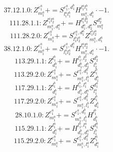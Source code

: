 \documentclass[letterpaper,10pt,fleqn,leqno,onecolumn]{article}
\begin{document}
\begin{equation} \;\;\;\;\;\;  37.12.1.0: Z^{e_{1}^{a}}_{m_{1}^{a}}+=S^{e_{1}^{a},d_{1}^{b}}_{l_{1}^{a}l_{1}^{b}}H^{l_{1}^{a}l_{1}^{b}}_{m_{1}^{a},d_{1}^{b}}\cdot -1. \end{equation}
\begin{equation} \;\;\;\;\;\;  111.28.1.1: Z^{l_{1}^{a}l_{2}^{a}}_{m_{1}^{a},d_{1}^{a}}+=H^{l_{1}^{a}l_{2}^{a}}_{d_{1}^{a},d_{2}^{a}}S^{d_{2}^{a}}_{m_{1}^{a}} \end{equation}
\begin{equation} \;\;\;\;\;\;  111.28.2.0: Z^{e_{1}^{a}}_{m_{1}^{a}}+=S^{e_{1}^{a},d_{1}^{a}}_{l_{1}^{a}l_{2}^{a}}Z^{l_{1}^{a}l_{2}^{a}}_{m_{1}^{a},d_{1}^{a}} \end{equation}
\begin{equation} \;\;\;\;\;\;  38.12.1.0: Z^{e_{1}^{a}}_{m_{1}^{a}}+=S^{e_{1}^{a},d_{1}^{a}}_{l_{1}^{a}l_{2}^{a}}H^{l_{1}^{a}l_{2}^{a}}_{m_{1}^{a},d_{1}^{a}}\cdot -1. \end{equation}
\begin{equation} \;\;\;\;\;\;  113.29.1.1: Z^{l_{1}^{b}}_{d_{1}^{b}}+=H^{l_{1}^{b},l_{2}^{b}}_{d_{1}^{b},d_{2}^{b}}S^{d_{2}^{b}}_{l_{2}^{b}} \end{equation}
\begin{equation} \;\;\;\;\;\;  113.29.2.0: Z^{e_{1}^{a}}_{m_{1}^{a}}+=S^{e_{1}^{a},d_{1}^{b}}_{m_{1}^{a},l_{1}^{b}}Z^{l_{1}^{b}}_{d_{1}^{b}} \end{equation}
\begin{equation} \;\;\;\;\;\;  117.29.1.1: Z^{l_{1}^{b}}_{d_{1}^{b}}+=H^{l_{1}^{b},l_{1}^{a}}_{d_{1}^{b},d_{1}^{a}}S^{d_{1}^{a}}_{l_{1}^{a}} \end{equation}
\begin{equation} \;\;\;\;\;\;  117.29.2.0: Z^{e_{1}^{a}}_{m_{1}^{a}}+=S^{e_{1}^{a},d_{1}^{b}}_{m_{1}^{a},l_{1}^{b}}Z^{l_{1}^{b}}_{d_{1}^{b}} \end{equation}
\begin{equation} \;\;\;\;\;\;  28.10.1.0: Z^{e_{1}^{a}}_{m_{1}^{a}}+=S^{e_{1}^{a},d_{1}^{b}}_{m_{1}^{a},l_{1}^{b}}H^{l_{1}^{b}}_{d_{1}^{b}} \end{equation}
\begin{equation} \;\;\;\;\;\;  115.29.1.1: Z^{l_{1}^{a}}_{d_{1}^{a}}+=H^{l_{1}^{b},l_{1}^{a}}_{d_{1}^{b},d_{1}^{a}}S^{d_{1}^{b}}_{l_{1}^{b}} \end{equation}
\begin{equation} \;\;\;\;\;\;  115.29.2.0: Z^{e_{1}^{a}}_{m_{1}^{a}}+=S^{e_{1}^{a},d_{1}^{a}}_{m_{1}^{a},l_{1}^{a}}Z^{l_{1}^{a}}_{d_{1}^{a}} \end{equation}
\end{document}
